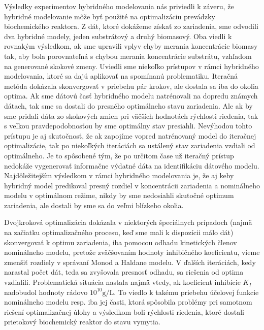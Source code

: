 Výsledky experimentov hybridného modelovania nás priviedli k záveru, že hybridné modelovanie môže byť použité na optimalizáciu prevádzky biochemického reaktora. Z dát, ktoré dokážeme získať zo zariadenia, sme odvodili dva hybridné modely, jeden substrátový a druhý biomasový. Oba viedli k rovnakým výsledkom, ak sme upravili vplyv chyby merania koncentrácie biomasy tak, aby bola porovnateľná s chybou merania koncentrácie substrátu, vzhľadom na generované skokové zmeny. Uviedli sme niekoľko prístupov v rámci hybridného modelovania, ktoré sa dajú aplikovať na spomínanú problematiku. Iteračná metóda dokázala skonvergovať v priebehu pár krokov, ale dostala sa iba do okolia optima. Ak sme dátovú časť hybridného modelu natrénovali na dopredu známych dátach, tak sme sa dostali do presného optimálneho stavu zariadenia. Ale ak by sme pridali dáta zo skokových zmien pri väčších hodnotách rýchlosti riedenia, tak s veľkou pravdepodobnosťou by sme optimálny stav presiahli. Nevýhodou tohto prístupu je aj skutočnosť, že ak zapojíme vopred natrénovaný model do iteračnej optimalizácie, tak po niekoľkých iteráciách sa ustálený stav zariadenia vzdiali od optimálneho. Je to spôsobené tým, že po určitom čase už iteračný prístup nedokáže vygenerovať informačne výdatné dáta na identifikáciu dátového modelu. Najdôležitejším výsledkom v rámci hybridného modelovania je, že aj keby hybridný model predikoval presný rozdiel v koncentrácii zariadenia a nominálneho modelu v optimálnom režime, nikdy by sme nedosiahli skutočné optimum zariadenia, ale dostali by sme sa do veľmi blízkeho okolia.

Dvojkroková optimalizácia dokázala v niektorých špeciálnych prípadoch (najmä na začiatku optimalizačného procesu, keď sme mali k dispozícii málo dát) skonvergovať k optimu zariadenia, iba pomocou odhadu kinetických členov nominálneho modelu, pretože zväčšovaním hodnoty inhibičného koeficientu, vieme zmenšiť rozdiely v správaní Monod a Haldane modelu.
V ďalších iteráciách, kedy narastal počet dát, teda sa zvyšovala presnosť odhadu, sa riešenia od optima vzdialili. Problematická situácia nastala najmä vtedy, ak koeficient inhibície $ K_I $ nadobudol hodnoty rádovo $ 10^{10}\si{\gram\per\liter} $. To viedlo k takému priebehu účelovej funkcie nominálneho modelu resp. iba jej časti, ktorá spôsobila problémy pri samotnom riešení optimalizačnej úlohy a výsledkom boli rýchlosti riedenia, ktoré dostali prietokový biochemický reaktor do stavu vymytia.

